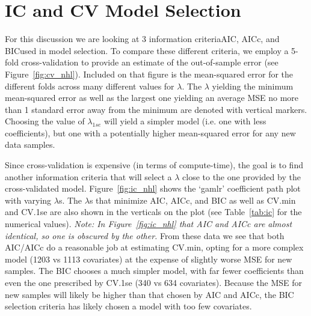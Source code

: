 \documentclass[11pt, fleqn]{article}
\begin{document}
\section{IC and CV Model Selection}
\label{sec:model}

For this discussion we are looking at 3 information criteria\textemdash AIC, AICc, and BIC\textemdash used in model selection.  To compare these different criteria, we employ a 5-fold cross-validation to provide an estimate of the out-of-sample error (see Figure~\vref{fig:cv_nhl}).  Included on that figure is the mean-squared error for the different folds across many different values for $\lambda$.  The $\lambda$ yielding the minimum mean-squared error as well as the largest one yielding an average MSE no more than 1 standard error away from the minimum are denoted with vertical markers.  Choosing the value of $\lambda_{1se}$ will yield a simpler model (i.e. one with less coefficients), but one with a potentially higher mean-squared error for any new data samples.

Since cross-validation is expensive (in terms of compute-time), the goal is to find another information criteria that will select a $\lambda$ close to the one provided by the cross-validated model.  Figure~\ref{fig:ic_nhl} shows the `gamlr' coefficient path plot with varying $\lambda$s.  The $\lambda$s that minimize AIC, AICc, and BIC as well as CV.min and CV.1se are also shown in the verticals on the plot (see Table~\vref{tab:ic} for the numerical values).  \textit{Note: In Figure~\vref{fig:ic_nhl} that AIC and AICc are almost identical, so one is obscured by the other.}  From these data we see that both AIC/AICc do a reasonable job at estimating CV.min, opting for a more complex model (1203 vs 1113 covariates) at the expense of slightly worse MSE for new samples.  The BIC chooses a much simpler model, with far fewer coefficients than even the one prescribed by CV.1se (340 vs 634 covariates).  Because the MSE for new samples will likely be higher than that chosen by AIC and AICc, the BIC selection criteria has likely chosen a model with too few covariates.


\end{document}
